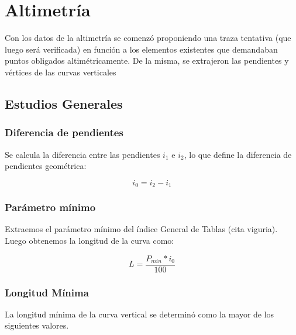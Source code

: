 \documentclass[../main.tex]{subfiles}
\begin{document}
\section{Altimetría}
Con los datos de la altimetría se comenzó proponiendo una traza tentativa (que luego será verificada) en función a los elementos existentes que demandaban puntos obligados altimétricamente. De la misma, se extrajeron las pendientes y vértices de las curvas verticales

\subsection{Estudios Generales}

\subsubsection{Diferencia de pendientes}
Se calcula la diferencia entre las pendientes $i_1$ e $i_2$, lo que define la diferencia de pendientes geométrica:

\begin{equation}
    i_0 = i_2 - i_1
\end{equation}


\subsubsection{Parámetro mínimo }

Extraemos el parámetro mínimo del índice General de Tablas (cita viguria). Luego obtenemos la longitud de la curva como:

\begin{equation}
    L = \frac{P_{min} * i_0}{100}
\end{equation}


\subsubsection{Longitud Mínima}

La longitud mínima de la curva vertical se determinó como la mayor de los siguientes valores.\cite{cornero_altimetria}
\end{document}
